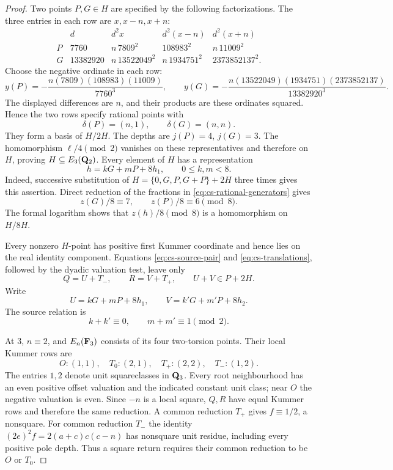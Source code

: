 \begin{proof}
Two points $P,G\in H$ are specified by the following factorizations.
The three entries in each row are $x,x-n,x+n$:
\begingroup\setlength{\arraycolsep}{3pt}
\begin{equation}\label{eq:cs-rational-generators}
\begin{array}{c|c|ccc}
 &d&d^2x&d^2(x-n)&d^2(x+n)\\ \hline
P&7760&n\,7809^2&108983^2&n\,11009^2\\
G&13382920&n\,13522049^2&n\,1934751^2&2373852137^2.
\end{array}
\end{equation}
\endgroup
Choose the negative ordinate in each row:
\[
 y(P)=-\frac{n(7809)(108983)(11009)}{7760^3},\qquad
 y(G)=-\frac{n(13522049)(1934751)(2373852137)}{13382920^3}.
\]
The displayed differences are $n$, and their products are these
ordinates squared.  Hence the two rows specify rational points with
\[
 \delta(P)=(n,1),\qquad \delta(G)=(n,n).
\]
They form a basis of $H/2H$.  The depths are $j(P)=4$, $j(G)=3$.
The homomorphism $\ell/4\pmod2$ vanishes on these representatives and
therefore on $H$, proving $H\subseteq E_3(\mathbf Q_2)$.  Every element of $H$
has a representation
\begin{equation}\label{eq:cs-mod-eight}
 h=kG+mP+8h_1,\qquad 0\leq k,m<8.
\end{equation}
Indeed, successive substitution of $H=\{0,G,P,G+P\}+2H$ three times
gives this assertion.  Direct reduction of the fractions in
\eqref{eq:cs-rational-generators} gives
\begin{equation}\label{eq:cs-z-eight}
 z(G)/8\equiv7,\qquad z(P)/8\equiv6\pmod8.
\end{equation}
The formal logarithm shows that $z(h)/8\pmod8$ is a homomorphism on
$H/8H$.

Every nonzero $H$-point has positive first Kummer coordinate and hence
lies on the real identity component.  Equations
\eqref{eq:cs-source-pair} and \eqref{eq:cs-translations}, followed by
the dyadic valuation test, leave only
\begin{equation}\label{eq:cs-15569-branch}
 Q=U+T_-,\qquad R=V+T_+,\qquad U+V\in P+2H.
\end{equation}
Write
\[
 U=kG+mP+8h_1,\qquad V=k'G+m'P+8h_2.
\]
The source relation is
\begin{equation}\label{eq:cs-parities}
 k+k'\equiv0,\qquad m+m'\equiv1\pmod2.
\end{equation}

At $3$, $n\equiv2$, and $E_n(\mathbf F_3)$ consists of its four two-torsion
points.  Their local Kummer rows are
\[
 O:(1,1),\quad T_0:(2,1),\quad
 T_+:(2,2),\quad T_-:(1,2).
\]
The entries $1,2$ denote unit squareclasses in $\mathbf Q_3$.
Every root neighbourhood has an even positive offset valuation and
the indicated constant unit class; near $O$ the negative valuation is
even.  Since $-n$ is a local square, $Q,R$ have equal Kummer rows and
therefore the same reduction.  A common reduction $T_+$ gives
$f\equiv1/2$, a nonsquare.  For common reduction $T_-$ the identity
$(2e)^2f=2(a+c)c(c-n)$ has nonsquare unit residue, including every
positive pole depth.  Thus a square return requires their common
reduction to be $O$ or $T_0$.


\end{proof}
